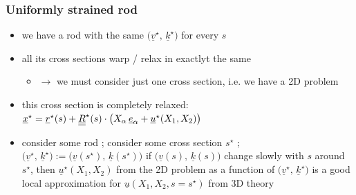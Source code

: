 \begin{frame}
  \frametitle{Uniformly strained rod}
  \vspace{-0.4em}
  \begin{itemize}
    \item we have a rod with the same $\bigl( \underline{v}^{\star}, \, \underline{k}^{\star} \bigr)$ for every $s$
    \item all its cross sections warp / relax in exactlyt the same
      \begin{itemize}
        \item $\rightarrow$ we must consider just one cross section, i.e. we have a 2D problem
      \end{itemize}
    \item this cross section is completely relaxed: $\underline{x}^{\star} = \underline{r}^{\star}(s) + \underline{\underline{R}}^{\star}(s) \cdot \bigl( X_{\alpha} \, \underline{e}_{\alpha} + \underline{u}^{\star}(X_1,X_2) \bigr)$
    \item consider some rod ; consider some cross section $s^{\star}$ ; $\bigl( \underline{v}^{\star}, \, \underline{k}^{\star} \bigr) := \bigl( \underline{v}(s^{\star}), \, \underline{k}(s^{\star}) \bigr)$ \newline
      if $\bigl( \underline{v}(s), \, \underline{k}(s) \bigr)$ change slowly with $s$ around $s^{\star}$, then $\underline{u}^{\star}(X_1,X_2)$ from the 2D problem as a function of $\bigl( \underline{v}^{\star}, \, \underline{k}^{\star} \bigr)$ is a good local approximation for $\underline{u}(X_1,X_2,s=s^{\star})$ from 3D theory
  \end{itemize}
\end{frame}


